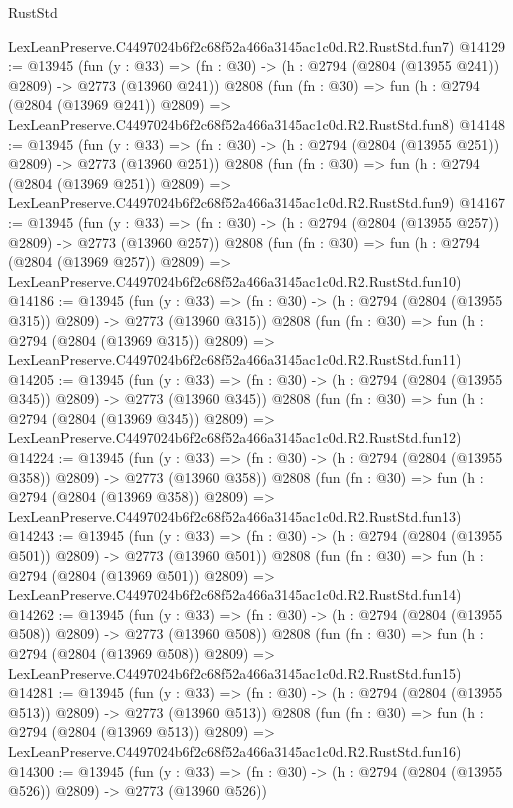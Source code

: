 \begin{lexlean}{RustStd}
\begin{coremodule}
    LexLeanPreserve.C4497024b6f2c68f52a466a3145ac1c0d.R2.RustStd.fun7)
@14129 := @13945
    (fun (y : @33) => (fn : @30) -> (h : @2794 (@2804 (@13955 @241)) @2809) -> @2773 (@13960 @241))
    @2808
    (fun (fn : @30) =>
    fun (h : @2794 (@2804 (@13969 @241)) @2809) =>
    LexLeanPreserve.C4497024b6f2c68f52a466a3145ac1c0d.R2.RustStd.fun8)
@14148 := @13945
    (fun (y : @33) => (fn : @30) -> (h : @2794 (@2804 (@13955 @251)) @2809) -> @2773 (@13960 @251))
    @2808
    (fun (fn : @30) =>
    fun (h : @2794 (@2804 (@13969 @251)) @2809) =>
    LexLeanPreserve.C4497024b6f2c68f52a466a3145ac1c0d.R2.RustStd.fun9)
@14167 := @13945
    (fun (y : @33) => (fn : @30) -> (h : @2794 (@2804 (@13955 @257)) @2809) -> @2773 (@13960 @257))
    @2808
    (fun (fn : @30) =>
    fun (h : @2794 (@2804 (@13969 @257)) @2809) =>
    LexLeanPreserve.C4497024b6f2c68f52a466a3145ac1c0d.R2.RustStd.fun10)
@14186 := @13945
    (fun (y : @33) => (fn : @30) -> (h : @2794 (@2804 (@13955 @315)) @2809) -> @2773 (@13960 @315))
    @2808
    (fun (fn : @30) =>
    fun (h : @2794 (@2804 (@13969 @315)) @2809) =>
    LexLeanPreserve.C4497024b6f2c68f52a466a3145ac1c0d.R2.RustStd.fun11)
@14205 := @13945
    (fun (y : @33) => (fn : @30) -> (h : @2794 (@2804 (@13955 @345)) @2809) -> @2773 (@13960 @345))
    @2808
    (fun (fn : @30) =>
    fun (h : @2794 (@2804 (@13969 @345)) @2809) =>
    LexLeanPreserve.C4497024b6f2c68f52a466a3145ac1c0d.R2.RustStd.fun12)
@14224 := @13945
    (fun (y : @33) => (fn : @30) -> (h : @2794 (@2804 (@13955 @358)) @2809) -> @2773 (@13960 @358))
    @2808
    (fun (fn : @30) =>
    fun (h : @2794 (@2804 (@13969 @358)) @2809) =>
    LexLeanPreserve.C4497024b6f2c68f52a466a3145ac1c0d.R2.RustStd.fun13)
@14243 := @13945
    (fun (y : @33) => (fn : @30) -> (h : @2794 (@2804 (@13955 @501)) @2809) -> @2773 (@13960 @501))
    @2808
    (fun (fn : @30) =>
    fun (h : @2794 (@2804 (@13969 @501)) @2809) =>
    LexLeanPreserve.C4497024b6f2c68f52a466a3145ac1c0d.R2.RustStd.fun14)
@14262 := @13945
    (fun (y : @33) => (fn : @30) -> (h : @2794 (@2804 (@13955 @508)) @2809) -> @2773 (@13960 @508))
    @2808
    (fun (fn : @30) =>
    fun (h : @2794 (@2804 (@13969 @508)) @2809) =>
    LexLeanPreserve.C4497024b6f2c68f52a466a3145ac1c0d.R2.RustStd.fun15)
@14281 := @13945
    (fun (y : @33) => (fn : @30) -> (h : @2794 (@2804 (@13955 @513)) @2809) -> @2773 (@13960 @513))
    @2808
    (fun (fn : @30) =>
    fun (h : @2794 (@2804 (@13969 @513)) @2809) =>
    LexLeanPreserve.C4497024b6f2c68f52a466a3145ac1c0d.R2.RustStd.fun16)
@14300 := @13945
    (fun (y : @33) => (fn : @30) -> (h : @2794 (@2804 (@13955 @526)) @2809) -> @2773 (@13960 @526))

\end{coremodule}
\end{lexlean}
